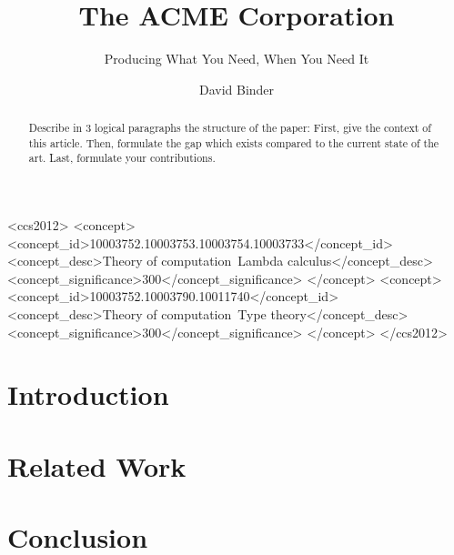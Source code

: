 \documentclass[acmsmall,review]{acmart}
\begin{document}
\title{The ACME Corporation}
\subtitle{Producing What You Need, When You Need It}



\begin{CCSXML}
  <ccs2012>
  <concept>
  <concept_id>10003752.10003753.10003754.10003733</concept_id>
  <concept_desc>Theory of computation~Lambda calculus</concept_desc>
  <concept_significance>300</concept_significance>
  </concept>
  <concept>
  <concept_id>10003752.10003790.10011740</concept_id>
  <concept_desc>Theory of computation~Type theory</concept_desc>
  <concept_significance>300</concept_significance>
  </concept>
  </ccs2012>
\end{CCSXML}

\author{David Binder}

\begin{abstract}
    Describe in 3 logical paragraphs the structure of the paper:
    First, give the context of this article.
    Then, formulate the gap which exists compared to the current state of the art.
    Last, formulate your contributions.
\end{abstract}

\maketitle

\section{Introduction}
\label{sec:intro}



\section{Related Work}
\label{sec:related-work}


\section{Conclusion}
\label{sec:conclusion}



\end{document}
